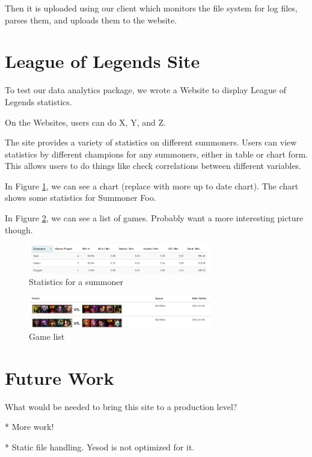 \documentclass{chi2009}
\begin{document}
Then it is uploaded using our client which monitors the file system for log files, parses them, and uploads them to the website. 

\section{League of Legends Site}
\label{site}

To test our data analytics package, we wrote a Website to display League of Legends statistics.

On the Websites, users can do X, Y, and Z. 

The site provides a variety of statistics on different summoners. Users can view statistics by different champions for any summoners, either in table or chart form. This allows users to do things like check correlations between different variables. 

In Figure \ref{chart}, we can see a chart (replace with more up to date chart). The chart shows some statistics for Summoner Foo. 

In Figure \ref{list}, we can see a list of games. Probably want a more interesting picture though.

\begin{figure}[h]
    \includegraphics[width=80mm]{imgs/stats.png}
    \caption{Statistics for a summoner}
    \label{chart}
\end{figure}

\begin{figure}[h]
    \includegraphics[width=80mm]{imgs/gamelist.png}
    \caption{Game list}
    \label{list}
\end{figure}

\section{Future Work}
\label{future}

What would be needed to bring this site to a production level?

* More work!

* Static file handling.  Yesod is not optimized for it.
\end{document}
